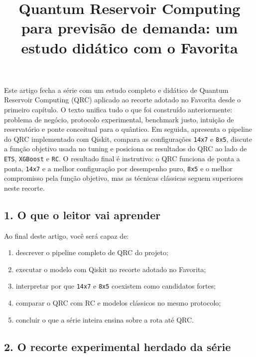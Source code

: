 \documentclass[12pt]{article}
\title{Quantum Reservoir Computing para previsão de demanda: um estudo didático com o Favorita}
\author{}
\providecommand{\tightlist}{%
          \setlength{\itemsep}{0pt}\setlength{\parskip}{0pt}}
\begin{document}
        \maketitle

        \begin{resumo}
        Este artigo fecha a série com um estudo completo e didático de Quantum Reservoir Computing (QRC) aplicado ao recorte adotado no Favorita desde o primeiro capítulo. O texto unifica tudo o que foi construído anteriormente: problema de negócio, protocolo experimental, benchmark justo, intuição de reservatório e ponte conceitual para o quântico. Em seguida, apresenta o pipeline do QRC implementado com Qiskit, compara as configurações \texttt{14x7} e \texttt{8x5}, discute a função objetivo usada no tuning e posiciona os resultados do QRC ao lado de \texttt{ETS}, \texttt{XGBoost} e \texttt{RC}. O resultado final é instrutivo: o QRC funciona de ponta a ponta, \texttt{14x7} e a melhor configuração por desempenho puro, \texttt{8x5} e o melhor compromisso pela função objetivo, mas as técnicas clássicas seguem superiores neste recorte.
        \end{resumo}

        \subsection{1. O que o leitor vai aprender}\label{1-o-que-o-leitor-vai-aprender}

Ao final deste artigo, você será capaz de:

\begin{enumerate}
\def\labelenumi{\arabic{enumi}.}
\tightlist
\item
  descrever o pipeline completo de QRC do projeto;
\item
  executar o modelo com Qiskit no recorte adotado no Favorita;
\item
  interpretar por que \texttt{14x7} e \texttt{8x5} coexistem como candidatos fortes;
\item
  comparar o QRC com RC e modelos clássicos no mesmo protocolo;
\item
  concluir o que a série inteira ensina sobre a rota até QRC.
\end{enumerate}

\subsection{2. O recorte experimental herdado da série}\label{2-o-recorte-experimental-herdado-da-suxe9rie}
\end{document}
